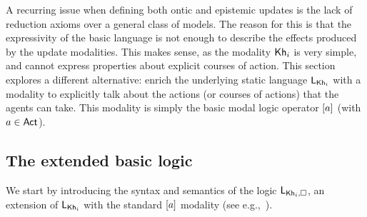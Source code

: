 A recurring issue when defining both ontic and epistemic updates is the lack of reduction axioms over a general class of models. The reason for this is that the expressivity of the basic language is not enough to describe the effects produced by the update modalities. This makes sense, as the modality ${\sf Kh}_i$ is very simple, and cannot express properties about explicit courses of action. 
%
%
%
This section explores a different alternative: enrich the underlying static language $\mathsf{L}_{{\sf Kh}_i}$ with a modality to explicitly talk about the actions (or courses of actions) that the agents can take. This modality is simply the basic modal logic operator $[a]$ (with $a\in{\rm \sf Act}$). 

\subsection{The extended basic logic}

We start by introducing the syntax and semantics of the logic $\mathsf{L}_{{\sf Kh}_i,\square}$,  an extension of $\mathsf{L}_{{\sf Kh}_i}$ with the standard $[a]$ modality (see e.g.,~\cite{HML,mlbook}).

